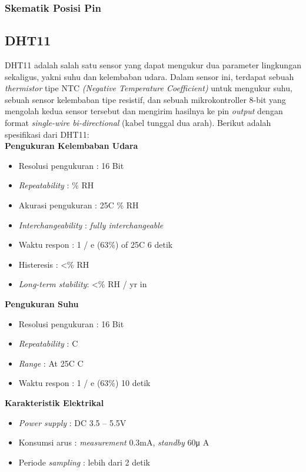 \subsubsection{Skematik Posisi Pin}

\subsection{DHT11}
\tab DHT11 adalah salah satu sensor yang dapat mengukur dua parameter lingkungan sekaligus, yakni suhu dan kelembaban udara. Dalam sensor ini, terdapat sebuah \textit{thermistor} tipe NTC \textit{(Negative Temperature Coefficient)} untuk mengukur suhu, sebuah sensor kelembaban tipe resistif, dan sebuah mikrokontroller 8-bit yang mengolah kedua sensor tersebut dan mengirim hasilnya ke pin \textit{output} dengan format \textit{single-wire bi-directional} (kabel tunggal dua arah). Berikut adalah spesifikasi dari DHT11:\\
\tab \textbf{Pengukuran Kelembaban Udara}
\begin{itemize}
	\item Resolusi pengukuran : 16 Bit
	\item \textit{Repeatability} : \% RH
	\item Akurasi pengukuran :  25\textdegree{}C \% RH
	\item \textit{Interchangeability} : \textit{fully interchangeable}
	\item Waktu respon : 1 / e (63\%) of 25\textdegree{}C 6 detik
	\item Histeresis : <\% RH
	\item \textit{Long-term stability}: <\% RH / yr in
\end{itemize}
\tab \textbf{Pengukuran Suhu}
\begin{itemize}
	\item Resolusi pengukuran : 16 Bit
	\item \textit{Repeatability} : \textdegree{}C
	\item \textit{Range} : At 25\textdegree{}C \textdegree{}C
	\item Waktu respon : 1 / e (63\%) 10 detik
\end{itemize}
\tab \textbf{Karakteristik Elektrikal}
\begin{itemize}
	\item \textit{Power supply} : DC 3.5 – 5.5V
	\item Konsumsi arus : \textit{measurement} 0.3mA, \textit{standby} 60μ A
	\item Periode \textit{sampling} : lebih dari 2 detik
\end{itemize}

